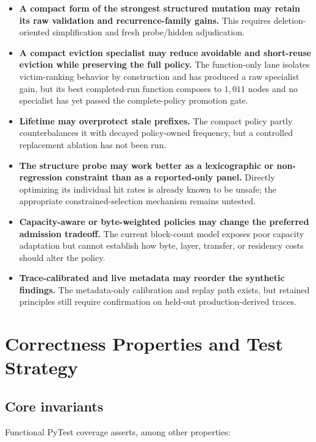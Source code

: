 \documentclass[11pt]{article}
\newcommand{\code}[1]{\texttt{\detokenize{#1}}}
\newcommand{\risk}[1]{\textbf{\color{red}#1}}
\begin{document}
\begin{itemize}
  \item \risk{A compact form of the strongest structured mutation may retain its raw
  validation and recurrence-family gains.}  This requires deletion-oriented
  simplification and fresh probe/hidden adjudication.
  \item \risk{A compact eviction specialist may reduce avoidable and short-reuse
  eviction while preserving the full policy.}  The function-only lane isolates
  victim-ranking behavior by construction and has produced a raw specialist gain, but
  its best completed-run function composes to \(1{,}011\) nodes and no specialist has yet
  passed the complete-policy promotion gate.
  \item \risk{Lifetime \code{block.hit_count} may overprotect stale prefixes.}  The
  compact policy partly counterbalances it with decayed policy-owned frequency, but a
  controlled replacement ablation has not been run.
  \item \risk{The structure probe may work better as a lexicographic or non-regression
  constraint than as a reported-only panel.}  Directly optimizing its individual hit
  rates is already known to be unsafe; the appropriate constrained-selection mechanism
  remains untested.
  \item \risk{Capacity-aware or byte-weighted policies may change the preferred
  admission tradeoff.}  The current block-count model exposes poor capacity adaptation
  but cannot establish how byte, layer, transfer, or residency costs should alter the
  policy.
  \item \risk{Trace-calibrated and live metadata may reorder the synthetic findings.}
  The metadata-only calibration and replay path exists, but retained principles still
  require confirmation on held-out production-derived traces.
\end{itemize}

\section{Correctness Properties and Test Strategy}

\subsection{Core invariants}

Functional PyTest coverage asserts, among other properties:
\end{document}
